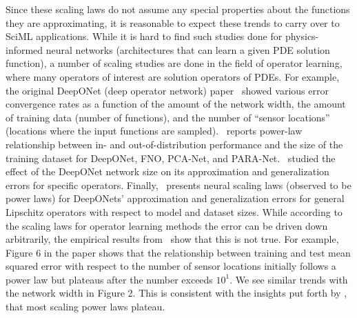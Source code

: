Since these scaling laws do not assume any special properties about the functions they are approximating, it is reasonable to expect these trends to carry over to SciML applications. While it is hard to find such studies done for physics-informed neural networks (architectures that can learn a given PDE solution function), a number of scaling studies are done in the field of operator learning, where many operators of interest are solution operators of PDEs. For example, the original DeepONet (deep operator network) paper~\citep{lu2019deeponet} showed various error convergence rates as a function of the amount of the network width, the amount of training data (number of functions), and the number of ``sensor locations'' (locations where the input functions are sampled).~\citep{de2022cost} reports power-law relationship between in- and out-of-distribution performance and the size of the training dataset for DeepONet, FNO, PCA-Net, and PARA-Net.~\citep{lanthaler2022error} studied the effect of the DeepONet network size on its approximation and generalization errors for specific operators. Finally,~\citep{liu2024neural} presents neural scaling laws (observed to be power laws) for DeepONets' approximation and generalization errors for general Lipschitz operators with respect to model and dataset sizes. While according to the scaling laws for operator learning methods the error can be driven down arbitrarily, the empirical results from~\citep{lu2019deeponet} show that this is not true. For example, Figure 6 in the paper shows that the relationship between training and test mean squared error with respect to the number of sensor locations initially follows a power law but plateaus after the number exceeds $10^1$. We see similar trends with the network width in Figure 2. This is consistent with the insights put forth by \citep{kaplan2020scaling}, that most scaling power laws plateau.

